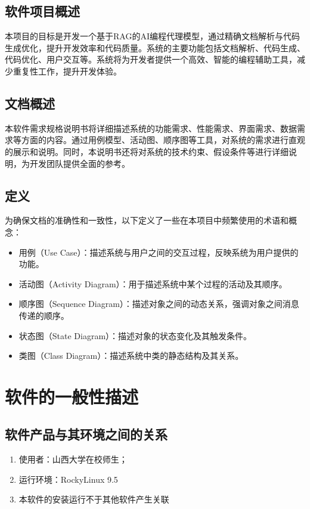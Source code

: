 \documentclass[
    report,     %
    oneside,    %
    UTF8,       %
    zihao=-4    %
]{config} %
\begin{document}
\subsection{软件项目概述}
本项目的目标是开发一个基于RAG的AI编程代理模型，通过精确文档解析与代码生成优化，提升开发效率和代码质量。系统的主要功能包括文档解析、代码生成、代码优化、用户交互等。系统将为开发者提供一个高效、智能的编程辅助工具，减少重复性工作，提升开发体验。

\subsection{文档概述}
本软件需求规格说明书将详细描述系统的功能需求、性能需求、界面需求、数据需求等方面的内容。通过用例模型、活动图、顺序图等工具，对系统的需求进行直观的展示和说明。同时，本说明书还将对系统的技术约束、假设条件等进行详细说明，为开发团队提供全面的参考。

\subsection{定义}
为确保文档的准确性和一致性，以下定义了一些在本项目中频繁使用的术语和概念：
\begin{itemize}
    \item 用例（Use Case）：描述系统与用户之间的交互过程，反映系统为用户提供的功能。
    \item 活动图（Activity Diagram）：用于描述系统中某个过程的活动及其顺序。
    \item 顺序图（Sequence Diagram）：描述对象之间的动态关系，强调对象之间消息传递的顺序。
    \item 状态图（State Diagram）：描述对象的状态变化及其触发条件。
    \item 类图（Class Diagram）：描述系统中类的静态结构及其关系。
\end{itemize}
\section{软件的一般性描述}
\subsection{软件产品与其环境之间的关系}
\begin{enumerate}[label=(\arabic*)]
\item 使用者：山西大学在校师生；
\item 运行环境：RockyLinux 9.5
\item 本软件的安装运行不于其他软件产生关联
\end{enumerate}
\end{document}
